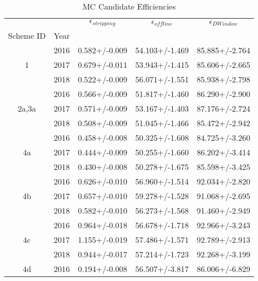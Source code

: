 \begin{table}
\centering
\caption{MC Candidate Efficiencies}
\label{tab:can_offdwin_1}
\begin{tabular}{ccccc}
\toprule
   &      & $\epsilon_{stripping}$ & $\epsilon_{offline}$ & $\epsilon_{D Window}$ \\
Scheme ID & Year &                        &                      &                       \\
\midrule
\multirow{3}{*}{1} & 2016 &          0.582+/-0.009 &       54.103+/-1.469 &        85.885+/-2.764 \\
   & 2017 &          0.679+/-0.011 &       53.943+/-1.415 &        85.606+/-2.665 \\
   & 2018 &          0.522+/-0.009 &       56.071+/-1.551 &        85.938+/-2.798 \\
\cline{1-5}
\multirow{3}{*}{2a,3a} & 2016 &          0.566+/-0.009 &       51.817+/-1.460 &        86.290+/-2.900 \\
   & 2017 &          0.571+/-0.009 &       53.167+/-1.403 &        87.176+/-2.724 \\
   & 2018 &          0.508+/-0.009 &       51.045+/-1.466 &        85.472+/-2.942 \\
\cline{1-5}
\multirow{3}{*}{4a} & 2016 &          0.458+/-0.008 &       50.325+/-1.608 &        84.725+/-3.260 \\
   & 2017 &          0.444+/-0.009 &       50.255+/-1.660 &        86.202+/-3.414 \\
   & 2018 &          0.430+/-0.008 &       50.278+/-1.675 &        85.598+/-3.425 \\
\cline{1-5}
\multirow{3}{*}{4b} & 2016 &          0.626+/-0.010 &       56.960+/-1.514 &        92.034+/-2.820 \\
   & 2017 &          0.657+/-0.010 &       59.278+/-1.528 &        91.068+/-2.695 \\
   & 2018 &          0.582+/-0.010 &       56.273+/-1.568 &        91.460+/-2.949 \\
\cline{1-5}
\multirow{3}{*}{4c} & 2016 &          0.964+/-0.018 &       56.678+/-1.718 &        92.966+/-3.243 \\
   & 2017 &          1.155+/-0.019 &       57.486+/-1.571 &        92.789+/-2.913 \\
   & 2018 &          0.944+/-0.017 &       57.214+/-1.723 &        92.268+/-3.199 \\
\cline{1-5}
\multirow{3}{*}{4d} & 2016 &          0.194+/-0.008 &       56.507+/-3.817 &        86.006+/-6.829 \\

\end{tabular}
\end{table}
